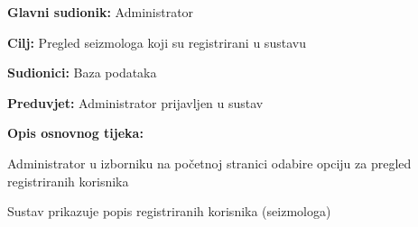 					\noindent {}
					\begin{packed_item}
	
						\item \textbf{Glavni sudionik:} Administrator
						\item \textbf{Cilj:} Pregled seizmologa koji su registrirani u sustavu
						\item \textbf{Sudionici:} Baza podataka
						\item \textbf{Preduvjet:} Administrator prijavljen u sustav
						\item \textbf{Opis osnovnog tijeka:}
						
						\item[] \begin{packed_enum}
	
							\item Administrator u izborniku na početnoj stranici odabire opciju za pregled registriranih korisnika
							\item Sustav prikazuje popis registriranih korisnika (seizmologa)
							
						\end{packed_enum}
					\end{packed_item}

